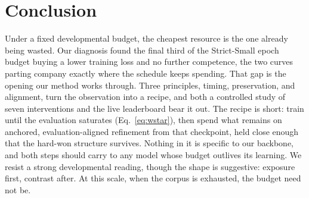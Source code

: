 \section{Conclusion}
\label{sec:conclusion}

Under a fixed developmental budget, the cheapest resource is the one
already being wasted. Our diagnosis found the final third of the
Strict-Small epoch budget buying a lower training loss and no further
competence, the two curves parting company exactly where the schedule
keeps spending. That gap is the opening our method works through. Three
principles, timing, preservation, and alignment, turn the observation into
a recipe, and both a controlled study of seven interventions and the live
leaderboard bear it out. The recipe is short: train until the evaluation
saturates (Eq.~\ref{eq:wstar}), then spend what remains on anchored,
evaluation-aligned refinement from that checkpoint, held close enough that
the hard-won structure survives. Nothing in it is specific to our
backbone, and both steps should carry to any model whose budget outlives
its learning. We resist a strong developmental reading, though the shape
is suggestive: exposure first, contrast after. At this scale, when the
corpus is exhausted, the budget need not be.
